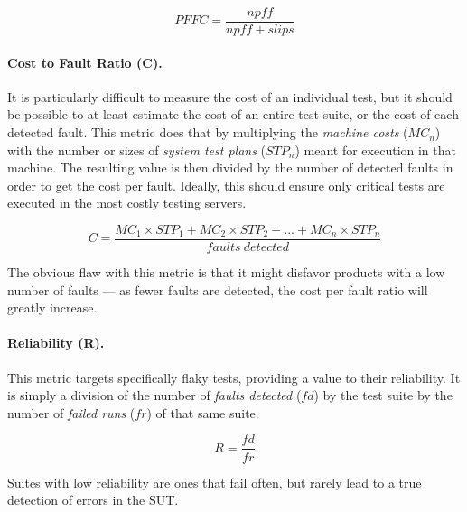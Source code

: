 $$ PFFC = \frac{npff}{npff + slips} $$

\paragraph{Cost to Fault Ratio (C).}
It is particularly difficult to measure the cost of an individual test, but it should be possible to at least estimate the cost of an entire test suite, or the cost of each detected fault.
This metric does that by multiplying the \textit{machine costs} ($MC_n$) with the number or sizes of \textit{system test plans} ($STP_n$) meant for execution in that machine.
The resulting value is then divided by the number of detected faults in order to get the cost per fault.
Ideally, this should ensure only critical tests are executed in the most costly testing servers.

$$ C = \frac{MC_1 \times STP_1 + MC_2 \times STP_2 + ... + MC_n \times STP_n}{faults\ detected} $$

The obvious flaw with this metric is that it might disfavor products with a low number of faults --- as fewer faults are detected, the cost per fault ratio will greatly increase.

\paragraph{Reliability (R).}
This metric targets specifically flaky tests, providing a value to their reliability.
It is simply a division of the number of \textit{faults detected} ($fd$) by the test suite by the number of \textit{failed runs} ($fr$) of that same suite.

$$ R = \frac{fd}{fr} $$

Suites with low reliability are ones that fail often, but rarely lead to a true detection of errors in the SUT.